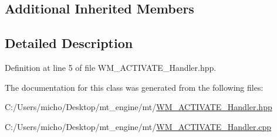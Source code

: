 \subsection*{Additional Inherited Members}


\subsection{Detailed Description}


Definition at line 5 of file W\+M\+\_\+\+A\+C\+T\+I\+V\+A\+T\+E\+\_\+\+Handler.\+hpp.



The documentation for this class was generated from the following files\+:\begin{DoxyCompactItemize}
\item 
C\+:/\+Users/micho/\+Desktop/mt\+\_\+engine/mt/\hyperlink{_w_m___a_c_t_i_v_a_t_e___handler_8hpp}{W\+M\+\_\+\+A\+C\+T\+I\+V\+A\+T\+E\+\_\+\+Handler.\+hpp}\item 
C\+:/\+Users/micho/\+Desktop/mt\+\_\+engine/mt/\hyperlink{_w_m___a_c_t_i_v_a_t_e___handler_8cpp}{W\+M\+\_\+\+A\+C\+T\+I\+V\+A\+T\+E\+\_\+\+Handler.\+cpp}\end{DoxyCompactItemize}
